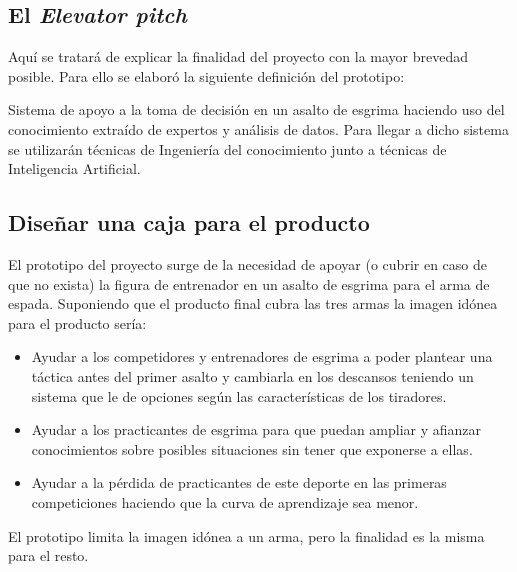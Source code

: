 \subsection{El \textit{Elevator pitch}}
Aquí se tratará de explicar la finalidad del proyecto con la mayor brevedad posible. Para ello
se elaboró la siguiente definición del prototipo:

Sistema de apoyo a la toma de decisión en un asalto de esgrima haciendo uso del
conocimiento extraído de expertos y análisis de datos. Para llegar a dicho sistema
se utilizarán técnicas de Ingeniería del conocimiento junto a técnicas de Inteligencia
Artificial.

\subsection{Diseñar una caja para el producto}
El prototipo del proyecto surge de la necesidad de apoyar (o cubrir en caso de que no exista)
la figura de entrenador en un asalto de esgrima para el arma de espada. Suponiendo que el
producto final cubra las tres armas la imagen idónea para el producto sería:

\begin{itemize}
  \item Ayudar a los competidores y entrenadores de esgrima a poder plantear una táctica antes
    del primer asalto y cambiarla en los descansos teniendo un sistema
    que le de opciones según las características de los tiradores.
  \item Ayudar a los practicantes de esgrima para que puedan ampliar y afianzar conocimientos
    sobre posibles situaciones sin tener que exponerse a ellas.
  \item Ayudar a la pérdida de practicantes de este deporte en las primeras competiciones haciendo
    que la curva de aprendizaje sea menor.
\end{itemize}

El prototipo limita la imagen idónea a un arma, pero la finalidad es la misma para el resto.
